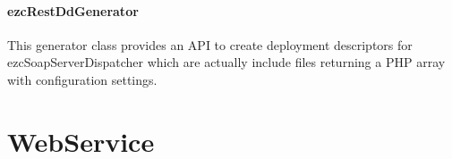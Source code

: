 \documentclass[10pt,final,a4paper,oneside]{article}
\begin{document}

\paragraph{ezcRestDdGenerator}
This generator class provides an API
to create deployment descriptors for
ezcSoapServerDispatcher which are
actually include files returning
a PHP array with configuration settings.







\section{WebService}\label{sec:WebService}
%
\end{document}
